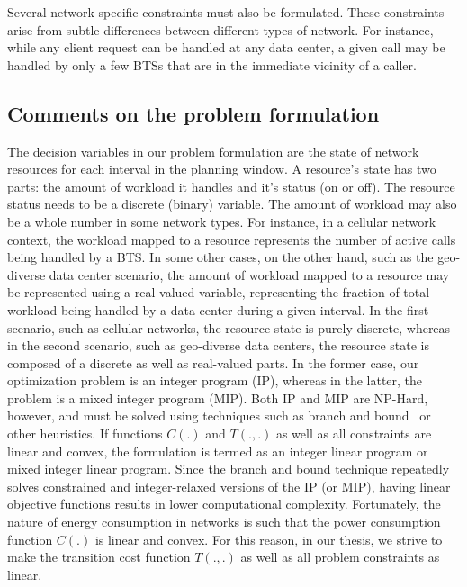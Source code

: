 Several network-specific constraints must also be formulated. These constraints arise from subtle differences between different types of network. For instance, while any client request can be handled at any data center, a given call may be handled by only a few BTSs that are in the immediate vicinity of a caller.

\subsection{Comments on the problem formulation}
The decision variables in our problem formulation are the state of network resources for each interval in the planning window. A resource's state has two parts: the amount of workload it handles and it's status (on or off). The resource status needs to be a discrete (binary) variable. The amount of workload may also be a whole number in some network types. For instance, in a cellular network context, the workload mapped to a resource represents the number of active calls being handled by a BTS. In some other cases, on the other hand, such as the geo-diverse data center scenario, the amount of workload mapped to a resource may be represented using a real-valued variable, representing the fraction of total workload being handled by a data center during a given interval. In the first scenario, such as cellular networks, the resource state is purely discrete, whereas in the second scenario, such as geo-diverse data centers, the resource state is composed of a discrete as well as real-valued parts. In the former case, our optimization problem is an integer program (IP), whereas in the latter, the problem is a mixed integer program (MIP). Both IP and MIP are NP-Hard, however, and must be solved using techniques such as branch and bound~\cite{land60a} or other heuristics. If functions $C(.)$ and $T(.,.)$ as well as all constraints are linear and convex, the formulation is termed as an integer linear program or mixed integer linear program. Since the branch and bound technique repeatedly solves constrained and integer-relaxed versions of the IP (or MIP), having linear objective functions results in lower computational complexity. Fortunately, the nature of energy consumption in networks is such that the power consumption function $C(.)$ is linear and convex. For this reason, in our thesis, we strive to make the transition cost function $T(.,.)$ as well as all problem constraints as linear.

